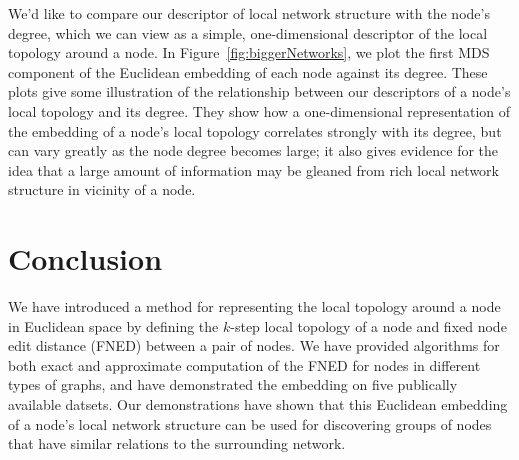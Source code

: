 \documentclass{article}
\begin{document}
We'd like to compare our descriptor of local network structure with the node's degree, which we can view as a simple, one-dimensional descriptor of the local topology around a node. In Figure~\ref{fig:biggerNetworks}, we plot the first MDS component of the Euclidean embedding of each node against its degree. These plots give some illustration of the relationship between our descriptors of a node's local topology and its degree. They show how a one-dimensional representation of the embedding of a node's local topology correlates strongly with its degree, but can vary greatly as the node degree becomes large; it also gives evidence for the idea that a large amount of information may be gleaned from rich local network structure in vicinity of a node.


\section{Conclusion}
\label{sec:conclusion}

We have introduced a method for representing the local topology around a node in Euclidean space by defining the $k$-step local topology of a node and fixed node edit distance (FNED) between a pair of nodes. We have provided algorithms for both exact and approximate computation of the FNED for nodes in different types of graphs, and have demonstrated the embedding on five publically available datsets. Our demonstrations have shown that this Euclidean embedding of a node's local network structure can be used for discovering groups of nodes that have similar relations to the surrounding network.


\begin{small}

 
\end{small}
\end{document}
